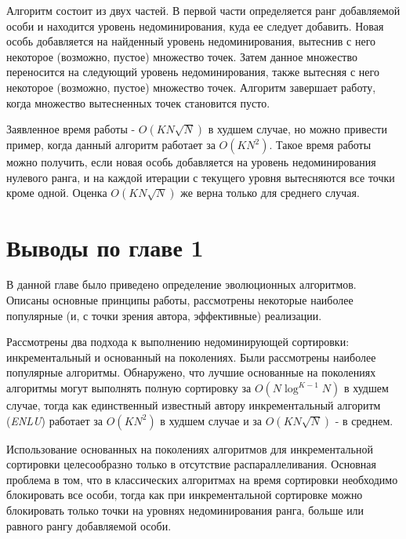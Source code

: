 Алгоритм состоит из двух частей. В первой части определяется ранг добавляемой особи и находится
уровень недоминирования, куда ее следует добавить. Новая особь добавляется на найденный уровень
недоминирования, вытеснив с него некоторое (возможно, пустое) множество точек. Затем данное множество
переносится на следующий уровень недоминирования, также вытесняя с него некоторое (возможно, пустое)
множество точек. Алгоритм завершает работу, когда множество вытесненных точек становится пусто.

Заявленное время работы - $O(KN \sqrt{N})$ в худшем случае, но можно привести пример, когда данный
алгоритм работает за $O(KN^2)$. Такое время работы можно получить, если новая особь добавляется на 
уровень недоминирования нулевого ранга, и на каждой итерации с текущего уровня вытесняются все точки 
кроме одной. Оценка $O(KN \sqrt{N})$ же верна только для среднего случая.

\section{Выводы по главе 1}
В данной главе было приведено определение эволюционных алгоритмов. Описаны основные принципы работы,
рассмотрены некоторые наиболее популярные (и, с точки зрения автора, эффективные) реализации.

Рассмотрены два подхода к выполнению недоминирующей сортировки: инкрементальный и основанный на 
поколениях. Были рассмотрены наиболее популярные алгоритмы. Обнаружено, что лучшие основанные на
поколениях алгоритмы могут выполнять полную сортировку за $O(N \log^{K - 1} N)$ в худшем случае,
тогда как единственный известный автору инкрементальный алгоритм (\textit{ENLU}) работает за 
$O(KN^2)$ в худшем случае и за $O(KN \sqrt{N})$ - в среднем.

Использование основанных на поколениях алгоритмов для инкрементальной сортировки целесообразно только
в отсутствие распараллеливания. Основная проблема в том, что в классических алгоритмах на время 
сортировки необходимо блокировать все особи, тогда как при инкрементальной сортировке можно блокировать
только точки на уровнях недоминирования ранга, больше или равного рангу добавляемой особи.